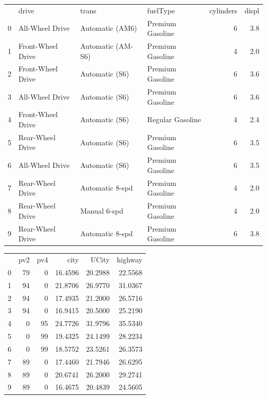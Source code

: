 \begin{tabular}{llllrr}
	{} &              drive &              trans &          fuelType &  cylinders &  displ \\
	0 &    All-Wheel Drive &    Automatic (AM6) &  Premium Gasoline &          6 &    3.8 \\
	1 &  Front-Wheel Drive &  Automatic (AM-S6) &  Premium Gasoline &          4 &    2.0 \\
	2 &  Front-Wheel Drive &     Automatic (S6) &  Premium Gasoline &          6 &    3.6 \\
	3 &    All-Wheel Drive &     Automatic (S6) &  Premium Gasoline &          6 &    3.6 \\
	4 &  Front-Wheel Drive &     Automatic (S6) &  Regular Gasoline &          4 &    2.4 \\
	5 &   Rear-Wheel Drive &     Automatic (S6) &  Premium Gasoline &          6 &    3.5 \\
	6 &    All-Wheel Drive &     Automatic (S6) &  Premium Gasoline &          6 &    3.5 \\
	7 &   Rear-Wheel Drive &    Automatic 8-spd &  Premium Gasoline &          4 &    2.0 \\
	8 &   Rear-Wheel Drive &       Manual 6-spd &  Premium Gasoline &          4 &    2.0 \\
	9 &   Rear-Wheel Drive &    Automatic 8-spd &  Premium Gasoline &          6 &    3.8 \\
\end{tabular}

\begin{tabular}{lrrrrr}
	{} &  pv2 &  pv4 &     city &    UCity &  highway \\
	0 &   79 &    0 &  16.4596 &  20.2988 &  22.5568 \\
	1 &   94 &    0 &  21.8706 &  26.9770 &  31.0367 \\
	2 &   94 &    0 &  17.4935 &  21.2000 &  26.5716 \\
	3 &   94 &    0 &  16.9415 &  20.5000 &  25.2190 \\
	4 &    0 &   95 &  24.7726 &  31.9796 &  35.5340 \\
	5 &    0 &   99 &  19.4325 &  24.1499 &  28.2234 \\
	6 &    0 &   99 &  18.5752 &  23.5261 &  26.3573 \\
	7 &   89 &    0 &  17.4460 &  21.7946 &  26.6295 \\
	8 &   89 &    0 &  20.6741 &  26.2000 &  29.2741 \\
	9 &   89 &    0 &  16.4675 &  20.4839 &  24.5605 \\
\end{tabular}

